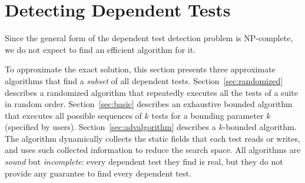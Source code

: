 \section{Detecting Dependent Tests}
\label{sec:detecting}

\newcommand{\smalltrialnum}{10\xspace}
\newcommand{\mediumtrialnum}{100\xspace}
\newcommand{\trialnum}{1000\xspace}

\newcommand{\testlist}[0]{\ensuremath{T^k_i}}
\newcommand{\executeTestsInOrder}[1]{\result{#1}{\env_0}}

Since the general form of the dependent test detection problem is
NP-complete, we do not expect to find an efficient algorithm for it.

To approximate the exact solution, this section
presents three approximate algorithms that find a \textit{subset} of
all dependent tests.
Section~\ref{sec:randomized} describes a randomized algorithm
that repeatedly executes all the tests of a suite in random order.
Section~\ref{sec:basic} describes an exhaustive bounded algorithm that
executes all possible sequences of $k$ tests for a bounding parameter $k$
(specified by users).
Section~\ref{sec:advalgorithm} describes a \dependenceaware{} $k$-bounded algorithm.
The \dependenceaware{} algorithm dynamically collects the
static fields that each test
reads or writes, and uses such collected information to reduce the search space.
All algorithms are \textit{sound} but \textit{incomplete}:
every dependent test they find is real, but they do not provide any
guarantee to find every dependent test.


